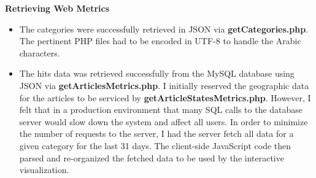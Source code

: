 \documentclass[12pt]{article}
\begin{document}
{\noindent\textbf{Retrieving Web Metrics}
\begin{itemize}
\item The categories were successfully retrieved in JSON via \textbf{getCategories.php}. The pertinent PHP files had to be encoded in UTF-8 to handle the Arabic characters.
\item The hits data was retrieved successfully from the MySQL database using JSON via \textbf{getArticlesMetrics.php}. I initially reserved the geographic data for the articles to be serviced by \textbf{getArticleStatesMetrics.php}. However, I felt that in a production environment that many SQL calls to the database server would slow down the system and affect all users. In order to minimize the number of requests to the server, I had the server fetch all data for a given category for the last 31 days. The client-side JavaScript code then parsed and re-organized the fetched data to be used by the interactive visualization.
\end{itemize}

\vspace{0.2in}

}
\end{document}
